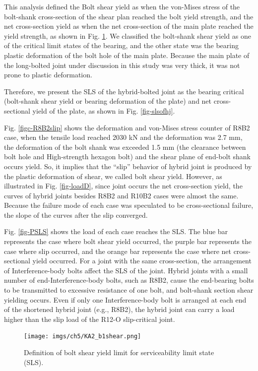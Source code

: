 This analysis defined the \ac{Bolt shear yield} as when the von-Mises stress of the bolt-shank cross-section of the shear plan reached the bolt yield strength, and the net cross-section yield as when the net cross-section of the main plate reached the yield strength, as shown in Fig. \ref{fig-defboltshear}. We classified the bolt-shank shear yield as one of the critical limit states of the bearing, and the other state was the bearing plastic deformation of the bolt hole of the main plate. Because the main plate of the long-bolted joint under discussion in this study was very thick, it was not prone to plastic deformation. 

Therefore, we present the SLS of the hybrid-bolted joint as the bearing critical (bolt-shank shear yield or bearing deformation of the plate) and net cross-sectional yield of the plate, as shown in Fig. \ref{fig-slsofhj}.

Fig. \ref{figc-R8B2slip} shows the deformation and von-Mises stress counter of R8B2 case, when the tensile load reached 2030 kN and the deformation was 2.7 mm, the deformation of the bolt shank was exceeded 1.5 mm (the clearance between bolt hole and High-strength hexagon bolt) and the shear plane of end-bolt shank occurs yield. So, it implies that the ``slip'' behavior of hybrid joint is produced by the plastic deformation of shear, we called bolt shear yield. However, as illustrated in Fig. \ref{fig-loadD}, since joint occurs the net cross-section yield, the curves of hybrid joints besides R8B2 and R10B2 cases were almost the same. Because the failure mode of each case was speculated to be cross-sectional failure, the slope of the curves after the slip converged. 

Fig. \ref{fig-PSLS} shows the load of each case reaches the SLS. The blue bar represents the case where bolt shear yield occurred, the purple bar represents the case where slip occurred, and the orange bar represents the case where net cross-sectional yield occurred. For a joint with the same cross-section, the arrangement of Interference-body bolts affect the SLS of the joint. Hybrid joints with a small number of end-Interference-body bolts, such as R8B2, cause the end-bearing bolts to be transmitted to excessive resistance of one bolt, and bolt-shank section shear yielding occurs. Even if only one Interference-body bolt is arranged at each end of the shortened hybrid joint (e.g., R8B2), the hybrid joint can carry a load higher than the slip load of the R12-O slip-critical joint.

\begin{figure}[htbp]
    \centering
    \texttt{[image: imgs/ch5/KA2\_b1shear.png]}
    \caption{Definition of bolt shear yield limit for serviceability limit state (SLS).}
    \label{fig-defboltshear}
\end{figure}

